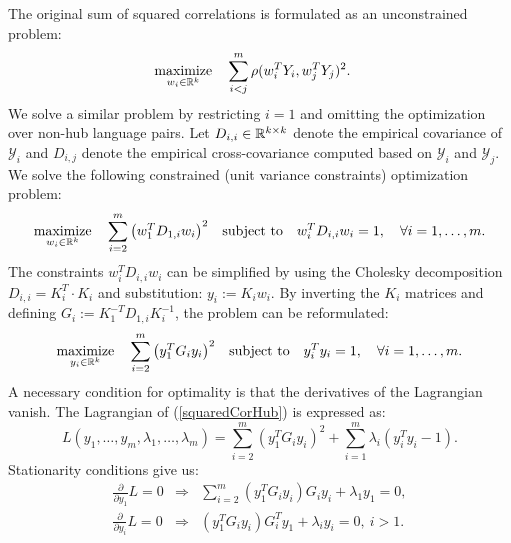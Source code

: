 The original sum of squared correlations is formulated as an unconstrained problem:
\begin{equation*}
  \begin{aligned}
    & \underset{w_i \in \mathbb{R}^{k}}{\text{maximize}}
    & & \sum_{i < j}^m  \rho(w_i^T Y_i, w_j^T Y_j)^2.
\end{aligned}
\end{equation*}
We solve a similar problem by restricting $i=1$ and omitting the optimization over non-hub
language pairs. Let $D_{i,i} \in \mathbb{R}^{k \times k}$ denote the empirical covariance of
$\mathcal{Y}_i$ and $D_{i,j}$ denote the empirical cross-covariance computed based on
$\mathcal{Y}_i$ and $\mathcal{Y}_j$. We solve the following constrained (unit variance
constraints) optimization problem:
\begin{equation}\label{squaredCorHubOriginal}
  \begin{aligned}
    & \underset{w_i \in \mathbb{R}^{k}}{\text{maximize}}
    & & \sum_{i = 2}^m  \left(w_1^T D_{1,i} w_i \right)^2
    & \text{subject to}
    & & w_i^T D_{i,i} w_i = 1, \quad\forall i = 1,\ldots, m.
\end{aligned}
\end{equation}
The constraints $w_i^T D_{i,i} w_i$ can be simplified by using the Cholesky decomposition
$D_{i,i} = K_i^T \cdot K_i$ and substitution: $y_i := K_i w_i$. By inverting the $K_i$
matrices and defining  $G_i := K_1^{-T} D_{1,i} K_i^{-1}$, the problem can be reformulated:
\begin{equation}\label{squaredCorHub}
  \begin{aligned}
    & \underset{y_i \in \mathbb{R}^{k}}{\text{maximize}}
    & & \sum_{i = 2}^m  \left(y_1^T G_{i} y_i \right)^2
    & \text{subject to}
    & & y_i^T y_i = 1, \quad\forall i = 1,\ldots, m.
\end{aligned}
\end{equation}
A necessary condition for optimality is that the derivatives of the Lagrangian vanish.
The Lagrangian of (\ref{squaredCorHub}) is expressed as:
$$  L(y_1, \ldots, y_m, \lambda_1, \ldots, \lambda_m) =
\sum_{i = 2}^m  \left(y_1^T G_{i} y_i \right)^2 + \sum_{i=1}^m \lambda_i \left(y_i^T y_i - 1\right).$$
Stationarity conditions give us:
\begin{eqnarray}
 \label{dLdx1}  \frac{\partial}{\partial y_1} L = 0 & \Rightarrow & \sum_{i = 2}^m  \left(y_1^T G_{i} y_i \right) G_i y_i + \lambda_1 y_1 = 0, \\
 \label{dLdxi} \frac{\partial}{\partial y_i} L = 0 & \Rightarrow & \left(y_1^T G_{i} y_i \right) G_{i}^T y_1 + \lambda_i y_i = 0,~i > 1.
\end{eqnarray}
